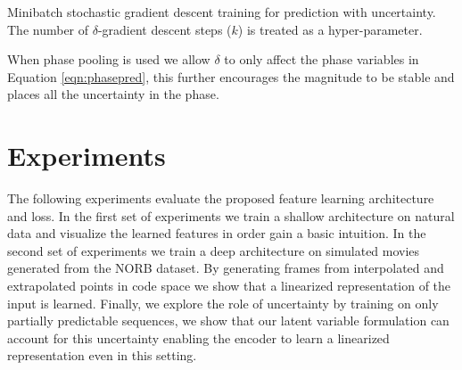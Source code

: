 \documentclass{article} %
\begin{document}
\begin{algorithm}
\caption{Minibatch stochastic gradient descent training for prediction with uncertainty. The number of $\delta$-gradient descent steps ($k$) is treated as a hyper-parameter. }
\begin{algorithmic}
\ENDFOR
{}
\ENDFOR
\end{algorithmic} 
\end{algorithm}
When phase pooling is used we allow $\delta$ to only affect the phase variables in Equation \ref{eqn:phasepred}, this further encourages the magnitude to be stable and places all the uncertainty in the phase.   

\section{Experiments} 
\label{sec:experiments}
The following experiments evaluate the proposed feature learning architecture and loss. In the first set of experiments we train a shallow architecture on natural data and visualize the learned features in order gain a basic intuition. In the second set of experiments we train a deep architecture on simulated movies generated from the NORB dataset. By generating frames from interpolated and extrapolated points in code space we show that a linearized representation of the input is learned. Finally, we explore the role of uncertainty by training on only partially predictable sequences, we show that our latent variable formulation can account for this uncertainty enabling the encoder to learn a linearized representation even in this setting.   
\end{document}
